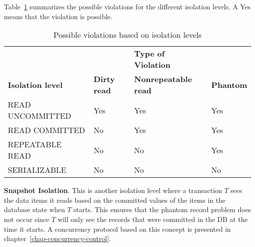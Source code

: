 Table~\ref{tab:chap20-isolation} summarizes the possible violations for the different isolation levels. A Yes means that the violation is possible. \\

\begin{table}[h!]
    \centering
    \bgroup
    \def\arraystretch{1.1}
    \begin{tabular}{llll}
         & & \textbf{Type of Violation} & \\\cline{2-4}
        \textbf{Isolation level} & \textbf{Dirty read} & \textbf{Nonrepeatable read} & \textbf{Phantom} \\
        READ UNCOMMITTED & Yes & Yes & Yes \\
        READ COMMITTED & No & Yes & Yes \\
        REPEATABLE READ & No & No & Yes \\
        SERIALIZABLE & No & No & No
    \end{tabular}
    \caption{Possible violations based on isolation levels}
    \label{tab:chap20-isolation}
    \egroup
\end{table}

\textbf{Snapshot Isolation}. This is another isolation level where a transaction $T$ sees the data items it reads based on the committed values of the items in the database state when $T$ starts. This ensures that the phantom record problem does not occur since $T$ will only see the records that were committed in the DB at the time it starts. A concurrency protocol based on this concept is presented in chapter~\ref{chap-concurrency-control}.